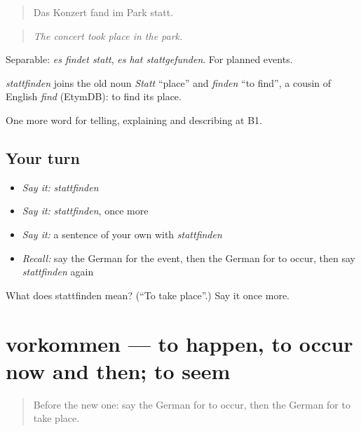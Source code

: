 \begin{quote}
Das Konzert fand im Park statt.
\end{quote}

\begin{quote}
\emph{The concert took place in the park.}
\end{quote}

Separable: \emph{es findet statt}, \emph{es hat stattgefunden}. For planned events.

\begin{cousinweb}
\emph{stattfinden} joins the old noun \emph{Statt} \textquotedblleft{}place\textquotedblright{} and \emph{finden} \textquotedblleft{}to find\textquotedblright{}, a cousin of English \emph{find} (EtymDB): to find its place.
\end{cousinweb}

\begin{grammarlens}[title={What you've built}]
One more word for telling, explaining and describing at B1.
\end{grammarlens}

\subsection*{Your turn}
\begin{itemize}
\raggedright
  \item \emph{Say it:} \emph{stattfinden}
  \item \emph{Say it:} \emph{stattfinden}, once more
  \item \emph{Say it:} a sentence of your own with \emph{stattfinden}
  \item \emph{Recall:} say the German for the event, then the German for to occur, then say \emph{stattfinden} again
\end{itemize}

\begin{tcolorbox}[breakable,colback=teal!4,colframe=teal!35!black,title={Before you move on}]
What does stattfinden mean? (\textquotedblleft{}To take place\textquotedblright{}.) Say it once more.
\end{tcolorbox}
\section[vorkommen]{vorkommen — to happen, to occur now and then; to seem}

\label{lesson:GE-C279-vorkommen}



\begin{quote}
Before the new one: say the German for to occur, then the German for to take place.
\end{quote}

